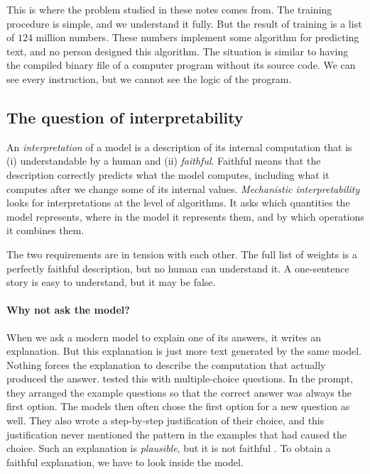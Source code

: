 This is where the problem studied in these notes comes from. The training procedure is simple, and we understand
it fully. But the result of training is a list of $124$ million numbers. These numbers implement some algorithm for
predicting text, and no person designed this algorithm. The situation is similar to having the compiled binary
file of a computer program without its source code. We can see every instruction, but we cannot see the logic of
the program.

\subsection{The question of interpretability}

\begin{definition}[Interpretability]\label{def:interp}
An \emph{interpretation} of a model is a description of its internal computation that is (i) understandable by
a human and (ii) \emph{faithful}. Faithful means that the description correctly predicts what the model computes,
including what it computes after we change some of its internal values.
\emph{Mechanistic interpretability} looks for interpretations at the level of algorithms. It asks which
quantities the model represents, where in the model it represents them, and by which operations it combines them.
\end{definition}

The two requirements are in tension with each other. The full list of weights is a perfectly faithful
description, but no human can understand it. A one-sentence story is easy to understand, but it may be false.

\paragraph{Why not ask the model?} When we ask a modern model to explain one of its answers, it writes an
explanation. But this explanation is just more text generated by the same model. Nothing forces the explanation to
describe the computation that actually produced the answer. \citet{turpin2023language} tested this with
multiple-choice questions. In the prompt, they arranged the example questions so that the correct answer was
always the first option. The models then often chose the first option for a new question as well. They also wrote
a step-by-step justification of their choice, and this justification never mentioned the pattern in the examples
that had caused the choice. Such an explanation is \emph{plausible}, but it is not faithful
\citep{jacovi2020towards}. To obtain a faithful explanation, we have to look inside the model.

